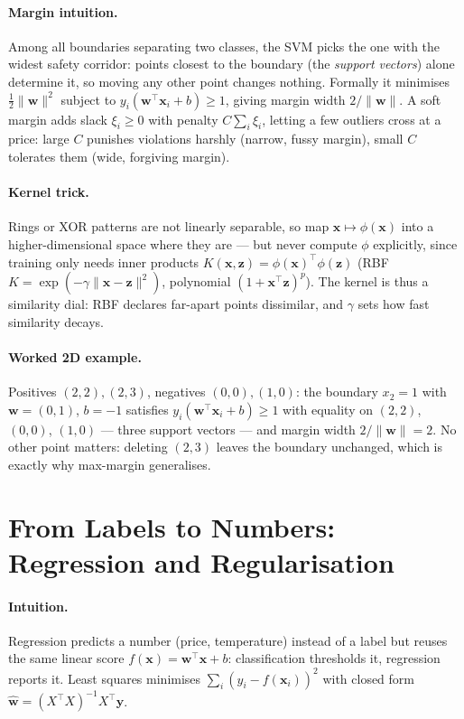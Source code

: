 \paragraph{Margin intuition.} Among all boundaries separating two classes, the SVM picks the one with the widest safety corridor: points closest to the boundary (the \emph{support vectors}) alone determine it, so moving any other point changes nothing. Formally it minimises $\frac{1}{2}\lVert\mathbf{w}\rVert^2$ subject to $y_i(\mathbf{w}^\top\mathbf{x}_i+b)\geq 1$, giving margin width $2/\lVert\mathbf{w}\rVert$. A soft margin adds slack $\xi_i\geq 0$ with penalty $C\sum_i\xi_i$, letting a few outliers cross at a price: large $C$ punishes violations harshly (narrow, fussy margin), small $C$ tolerates them (wide, forgiving margin).
\paragraph{Kernel trick.} Rings or XOR patterns are not linearly separable, so map $\mathbf{x}\mapsto\phi(\mathbf{x})$ into a higher-dimensional space where they are --- but never compute $\phi$ explicitly, since training only needs inner products $K(\mathbf{x},\mathbf{z})=\phi(\mathbf{x})^\top\phi(\mathbf{z})$ (RBF $K=\exp(-\gamma\lVert\mathbf{x}-\mathbf{z}\rVert^2)$, polynomial $(1+\mathbf{x}^\top\mathbf{z})^p$). The kernel is thus a similarity dial: RBF declares far-apart points dissimilar, and $\gamma$ sets how fast similarity decays.
\paragraph{Worked 2D example.} Positives $(2,2),(2,3)$, negatives $(0,0),(1,0)$: the boundary $x_2=1$ with $\mathbf{w}=(0,1)$, $b=-1$ satisfies $y_i(\mathbf{w}^\top\mathbf{x}_i+b)\geq 1$ with equality on $(2,2)$, $(0,0)$, $(1,0)$ --- three support vectors --- and margin width $2/\lVert\mathbf{w}\rVert=2$. No other point matters: deleting $(2,3)$ leaves the boundary unchanged, which is exactly why max-margin generalises.
\section{From Labels to Numbers: Regression and Regularisation}
\label{sec:regression}
\paragraph{Intuition.} Regression predicts a number (price, temperature) instead of a label but reuses the same linear score $f(\mathbf{x})=\mathbf{w}^\top\mathbf{x}+b$: classification thresholds it, regression reports it. Least squares minimises $\sum_i(y_i-f(\mathbf{x}_i))^2$ with closed form $\hat{\mathbf{w}}=(X^\top X)^{-1}X^\top\mathbf{y}$.
